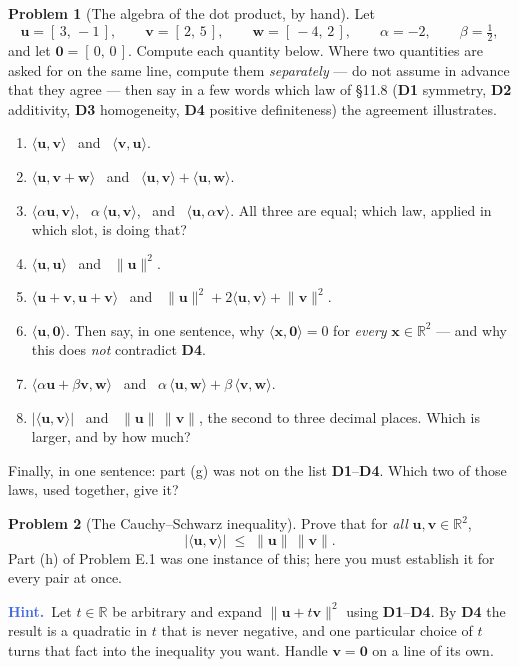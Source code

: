 \documentclass[11pt]{article}
\theoremstyle{definition}
\newtheorem{prob}{Problem}[section]
\newcommand{\hint}[1]{\par\smallskip\noindent
  {\small\sffamily\textcolor{RoyalBlue}{\textbf{Hint.}}\ #1}\par\smallskip}
\newcommand{\R}{\mathbb{R}}
\newcommand{\vc}[1]{\mathbf{#1}}
\newcommand{\norm}[1]{\lVert #1\rVert}
\newcommand{\ip}[2]{\langle #1,#2\rangle}
\begin{document}
\begin{prob}[The algebra of the dot product, by hand]
Let
\[
  \vc{u}=[\,3,\,-1\,],\qquad
  \vc{v}=[\,2,\,5\,],\qquad
  \vc{w}=[\,-4,\,2\,],\qquad
  \alpha=-2,\qquad \beta=\tfrac12 ,
\]
and let $\vc{0}=[\,0,\,0\,]$. Compute each quantity below. Where two quantities
are asked for on the same line, compute them \emph{separately} --- do not assume
in advance that they agree --- then say in a few words which law of \S11.8
(\textbf{D1} symmetry, \textbf{D2} additivity, \textbf{D3} homogeneity,
\textbf{D4} positive definiteness) the agreement illustrates.

\begin{enumerate}[label=\textbf{(\alph*)},leftmargin=2.6em,itemsep=7pt,topsep=6pt]
  \item $\ip{\vc{u}}{\vc{v}}$ \ and \ $\ip{\vc{v}}{\vc{u}}$.
  \item $\ip{\vc{u}}{\vc{v}+\vc{w}}$ \ and \
        $\ip{\vc{u}}{\vc{v}}+\ip{\vc{u}}{\vc{w}}$.
  \item $\ip{\alpha\vc{u}}{\vc{v}}$, \ $\alpha\,\ip{\vc{u}}{\vc{v}}$, \ and \
        $\ip{\vc{u}}{\alpha\vc{v}}$. All three are equal; which law, applied in
        which slot, is doing that?
  \item $\ip{\vc{u}}{\vc{u}}$ \ and \ $\norm{\vc{u}}^{2}$.
  \item $\ip{\vc{u}+\vc{v}}{\vc{u}+\vc{v}}$ \ and \
        $\norm{\vc{u}}^{2}+2\ip{\vc{u}}{\vc{v}}+\norm{\vc{v}}^{2}$.
  \item $\ip{\vc{u}}{\vc{0}}$. Then say, in one sentence, why
        $\ip{\vc{x}}{\vc{0}}=0$ for \emph{every} $\vc{x}\in\R^{2}$ --- and why
        this does \emph{not} contradict \textbf{D4}.
  \item $\ip{\alpha\vc{u}+\beta\vc{v}}{\vc{w}}$ \ and \
        $\alpha\,\ip{\vc{u}}{\vc{w}}+\beta\,\ip{\vc{v}}{\vc{w}}$.
  \item $\lvert\ip{\vc{u}}{\vc{v}}\rvert$ \ and \ $\norm{\vc{u}}\,\norm{\vc{v}}$,
        the second to three decimal places. Which is larger, and by how much?
\end{enumerate}

\noindent Finally, in one sentence: part (g) was not on the list \textbf{D1}--\textbf{D4}.
Which two of those laws, used together, give it?
\end{prob}

\begin{prob}[The Cauchy--Schwarz inequality]
Prove that for \emph{all} $\vc{u},\vc{v}\in\R^{2}$,
\[
  \bigl\lvert\ip{\vc{u}}{\vc{v}}\bigr\rvert
  \;\le\;
  \norm{\vc{u}}\,\norm{\vc{v}} .
\]
Part (h) of Problem E.1 was one instance of this; here you must establish it for
every pair at once.

\hint{Let $t\in\R$ be arbitrary and expand $\norm{\vc{u}+t\vc{v}}^{2}$ using
\textbf{D1}--\textbf{D4}. By \textbf{D4} the result is a quadratic in $t$ that is
never negative, and one particular choice of $t$ turns that fact into the
inequality you want. Handle $\vc{v}=\vc{0}$ on a line of its own.}
\end{prob}
\end{document}
